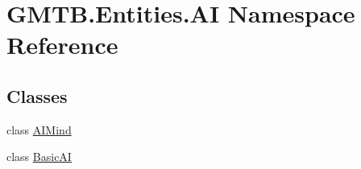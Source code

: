 \hypertarget{namespace_g_m_t_b_1_1_entities_1_1_a_i}{}\section{G\+M\+T\+B.\+Entities.\+AI Namespace Reference}
\label{namespace_g_m_t_b_1_1_entities_1_1_a_i}
\subsection*{Classes}
\begin{DoxyCompactItemize}
\item 
class \mbox{\hyperlink{class_g_m_t_b_1_1_entities_1_1_a_i_1_1_a_i_mind}{A\+I\+Mind}}
\item 
class \mbox{\hyperlink{class_g_m_t_b_1_1_entities_1_1_a_i_1_1_basic_a_i}{Basic\+AI}}
\end{DoxyCompactItemize}
